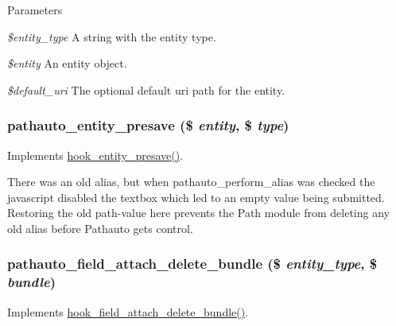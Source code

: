 \begin{DoxyParams}{Parameters}
\item[{\em \$entity\_\-type}]A string with the entity type. \item[{\em \$entity}]An entity object. \item[{\em \$default\_\-uri}]The optional default uri path for the entity. \end{DoxyParams}
\hypertarget{pathauto_8module_ae713b574335b0b8a1069a37d63c5c365}{
\subsubsection[{pathauto\_\-entity\_\-presave}]{\setlength{\rightskip}{0pt plus 5cm}pathauto\_\-entity\_\-presave (\$ {\em entity}, \/  \$ {\em type})}}
\label{pathauto_8module_ae713b574335b0b8a1069a37d63c5c365}
Implements \hyperlink{group__hooks_ga1837f8059e89f6b0c00826f3e06e24f7}{hook\_\-entity\_\-presave()}. 

There was an old alias, but when pathauto\_\-perform\_\-alias was checked the javascript disabled the textbox which led to an empty value being submitted. Restoring the old path-\/value here prevents the Path module from deleting any old alias before Pathauto gets control.\hypertarget{pathauto_8module_a52aef356ab5cb0ed895cd418645512f5}{
\subsubsection[{pathauto\_\-field\_\-attach\_\-delete\_\-bundle}]{\setlength{\rightskip}{0pt plus 5cm}pathauto\_\-field\_\-attach\_\-delete\_\-bundle (\$ {\em entity\_\-type}, \/  \$ {\em bundle})}}
\label{pathauto_8module_a52aef356ab5cb0ed895cd418645512f5}
Implements \hyperlink{group__field__attach_gac2aac33854dd18a2037a13b133c26481}{hook\_\-field\_\-attach\_\-delete\_\-bundle()}.

